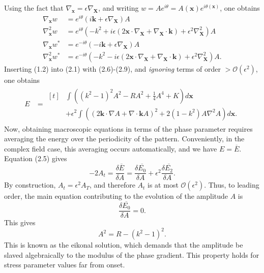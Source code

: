 \documentclass[12pt]{article}
\numberwithin{equation}{section}
\begin{document}
Using the fact that $\nabla_{\bm{x}} = \epsilon\nabla_{\bm{X}}$, and writing $w=Ae^{i\theta}=A(\bm{x})e^{i\theta(\bm{x})}$, one obtains
\begin{align}
    \nabla_{\bm{x}}w &= e^{i\theta}(i\bm{k}+\epsilon\nabla_{\bm{X}})A\\
    \nabla^2_{\bm{x}}w &= e^{i\theta}(-k^2+i\epsilon(2\bm{x}\cdot \nabla_{\bm{X}}+\nabla_{\bm{X}}\cdot\bm{k})+\epsilon^2\nabla^2_{\bm{X}})A\\
 \nabla_{\bm{x}}w^* &= e^{-i\theta}(-i\bm{k}+\epsilon\nabla_{\bm{X}})A\\
    \nabla^2_{\bm{x}}w^* &= e^{-i\theta}(-k^2-i\epsilon(2\bm{x}\cdot \nabla_{\bm{X}}+\nabla_{\bm{X}}\cdot\bm{k})+\epsilon^2\nabla^2_{\bm{X}})A.
\end{align}
Inserting (1.2) into (2.1) with (2.6)-(2.9), and \emph{ignoring} terms of order $> \mathcal{O}(\epsilon^2)$, one obtains
\begin{align}
    E &= \begin{aligned}[t]
         &\int \left( (k^2-1)^2A^2 - RA^2 + \frac{1}{4}A^4 + K\right)d\bm{x}\\
         & + \epsilon^2 \int \left( (2\bm{k}\cdot \nabla A + \nabla \cdot \bm{k}A)^2 + 2(1-k^2)A\nabla^2A \right)d\bm{x}.
         \end{aligned}
\end{align}
Now, obtaining macroscopic equations in terms of the phase parameter requires averaging the energy over the periodicity of the pattern. Conveniently, in the complex field case, this averaging occurs automatically, and we have $E = \overline{E}$. Equation (2.5) gives
\begin{equation}
    -2A_t = \frac{\delta \overline{E}}{\delta A} = \frac{\delta\overline{E_0}}{\delta A}+\epsilon^2 \frac{\delta \overline{E_2}}{\delta A}.
\end{equation}
By construction, $A_t = \epsilon^2 A_T$, and therefore $A_t$ is at most $\mathcal{O}(\epsilon^2)$. Thus, to leading order, the main equation contributing to the evolution of the amplitude $A$ is 
\begin{equation}
    \frac{\delta \overline{E_0}}{\delta A} = 0.
\end{equation}
This gives
\begin{equation}
    A^2 = R - (k^2-1)^2.
\end{equation}
This is known as the eikonal solution, which demands that the amplitude be slaved algebraically to the modulus of the phase gradient. This property holds for stress parameter values far from onset. 
\end{document}

